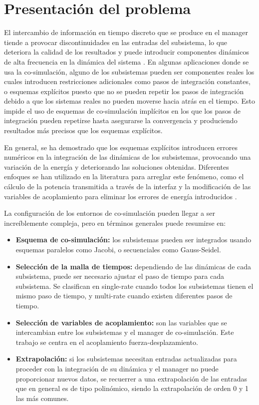 \section{Presentación del problema}
\label{sec:problema}

El intercambio de información en tiempo discreto que se produce en el manager tiende a provocar discontinuidades en las entradas del subsistema, lo que deteriora la calidad de los resultados y puede introducir componentes dinámicos de alta frecuencia en la dinámica del sistema \cite{Benedikt2013}.
En algunas aplicaciones donde se usa la co-simulación, alguno de los subsistemas pueden ser componentes reales los cuales introducen restricciones adicionales como pasos de integración constantes, o esquemas explícitos puesto que no se pueden repetir los pasos de integración debido a que los sistemas reales no pueden moverse hacia atrás en el tiempo.
Esto impide el uso de esquemas de co-simulación implícitos en los que los pasos de integración pueden repetirse hasta asegurarse la convergencia y produciendo resultados más precisos que los esquemas explícitos.

En general, se ha demostrado que los esquemas explícitos introducen errores numéricos en la integración de las dinámicas de los subsistemas, provocando una variación de la energía y deteriorando las soluciones obtenidas.
Diferentes enfoques se han utilizado en la literatura para arreglar este fenómeno, como el cálculo de  la potencia transmitida a través de la interfaz y la modificación de las variables de acoplamiento para eliminar los errores de energía introducidos \cite{Sadjina2017, Rodriguez2022}.

La configuración de los entornos de co-simulación pueden llegar a ser increíblemente compleja, pero en términos generales puede resumirse en:
%
\begin{itemize}
    \item \textbf{Esquema de co-simulación:} los subsistemas pueden ser integrados usando esquemas paralelos como Jacobi, o secuenciales como Gauss-Seidel.  
    \item \textbf{Selección de la malla de tiempos:} dependiendo de las dinámicas de cada subsistema, puede ser necesario ajustar el paso de tiempo para cada subsistema. Se clasifican en single-rate cuando todos los subsistemas tienen el mismo paso de tiempo, y multi-rate cuando existen diferentes pasos de tiempo.
    \item \textbf{Selección de variables de acoplamiento:} son las variables que se intercambian entre los subsistemas y el manager de co-simulación. Este trabajo se centra en el acoplamiento fuerza-desplazamiento.
    \item \textbf{Extrapolación:} si los subsistemas necesitan entradas actualizadas para proceder con la integración de su dinámica y el manager no puede proporcionar nuevos datos, se recuerrer a una extrapolación de las entradas que en general es de tipo polinómico, siendo la extrapolación de orden 0 y 1 las más comunes.
\end{itemize}